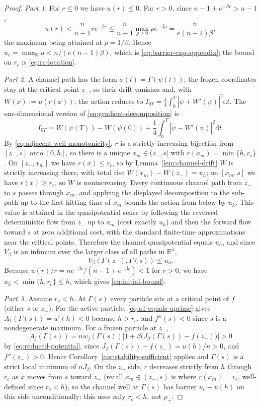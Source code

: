 \documentclass{opt2026} %
\newcommand{\dd}{\mathrm d}
\newcommand{\prefactor}[2]{A_{#1}(#2)}
\newcommand{\R}{\mathbb{R}}
\begin{document}
\begin{proof}
    \emph{Part 1.} For $r\le0$ we have $u(r)\le0$. For $r>0$, since $n-1+e^{-\beta r}>n-1$,
    \[
        u(r)<\frac{n}{n-1}re^{-\beta r}\le\frac{n}{n-1}\max_{\rho\ge0}\rho e^{-\beta\rho}=\frac{n}{e(n-1)\beta},
    \]
    the maximum being attained at $\rho=1/\beta$. Hence $u_c=\max_\R u<n/(e(n-1)\beta)$, which is \eqref{eq:barrier-cap-appendix}; the bound on $r_c$ is \eqref{eq:rc-location}.

    \emph{Part 2.} A channel path has the form $\phi(t)=\Gamma(\psi(t))$; the frozen coordinates stay at the critical point $z_-$, so their drift vanishes and, with $W(x):=u(r(x))$, the action reduces to $I_{0T}=\frac14\int_0^T|\dot\psi+W'(\psi)|^2\dd t$. The one-dimensional version of \eqref{eq:gradient-decomposition} is
    \[
        I_{0T}=W(\psi(T))-W(\psi(0))+\frac14\int_0^T|\dot\psi-W'(\psi)|^2\dd t.
    \]
    By \eqref{eq:adjacent-well-monotonicity}, $r$ is a strictly increasing bijection from $[z_-,s]$ onto $[0,h]$, so there is a unique $x_m\in(z_-,s]$ with $r(x_m)=\min\{h,r_c\}$. On $[z_-,x_m]$ we have $r(x)\le r_c$, so by Lemma~\ref{lem:channel-drift} $W$ is strictly increasing there, with total rise $W(x_m)-W(z_-)=u_h$; on $[x_m,s]$ we have $r(x)\ge r_c$, so $W$ is nonincreasing. Every continuous channel path from $z_-$ to $s$ passes through $x_m$, and applying the displayed decomposition to the sub-path up to the first hitting time of $x_m$ bounds the action from below by $u_h$. This value is attained in the quasipotential sense by following the reversed deterministic flow from $z_-$ up to $x_m$ (cost exactly $u_h$) and then the forward flow toward $s$ at zero additional cost, with the standard finite-time approximations near the critical points. Therefore the channel quasipotential equals $u_h$, and since $V_\beta$ is an infimum over the larger class of all paths in $\R^n$,
    \[
        V_\beta(\Gamma(z_-),\Gamma(s))\le u_h.
    \]
    Because $u(r)/r=ne^{-\beta r}/(n-1+e^{-\beta r})<1$ for $r>0$, we have $u_h<\min\{h,r_c\}\le h$, which gives \eqref{eq:initial-bound}.

    \emph{Part 3.} Assume $r_c<h$. At $\Gamma(s)$ every particle sits at a critical point of $f$ (either $s$ or $z_-$). For the active particle, \eqref{eq:a1-equals-uprime} gives $\prefactor{1}{\Gamma(s)}=u'(h)<0$ because $h>r_c$, and $f''(s)<0$ since $s$ is a nondegenerate maximum. For a frozen particle at $z_-$,
    \[
        \prefactor{j}{\Gamma(s)} = nw_j(\Gamma(s))\bigl[1+\beta\bigl(J_\beta(\Gamma(s))-f(z_-)\bigr)\bigr]>0
    \]
    by \eqref{eq:reduced-potential}, since $J_\beta(\Gamma(s))-f(z_-)=u(h)/n>0$, and $f''(z_-)>0$. Hence Corollary~\ref{cor:stability-sufficient} applies and $\Gamma(s)$ is a strict local minimum of $nJ_\beta$. On the $z_-$ side, $r$ decreases strictly from $h$ through $r_c$ as $x$ moves from $s$ toward $z_-$ (recall $x_m\in(z_-,s)$ is where $r(x_m)=r_c$, well-defined since $r_c<h$), so the channel well at $\Gamma(s)$ has barrier $u_c-u(h)$ on this side unconditionally: this uses only $r_c<h$, not $\rho_+$.


\end{proof}
\end{document}
